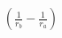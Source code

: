 \documentclass[preview]{standalone}
\begin{document}
\begin{align*}
\left( \frac{1}{r_b} - \frac{1}{r_a} \right)
\end{align*}
\end{document}
